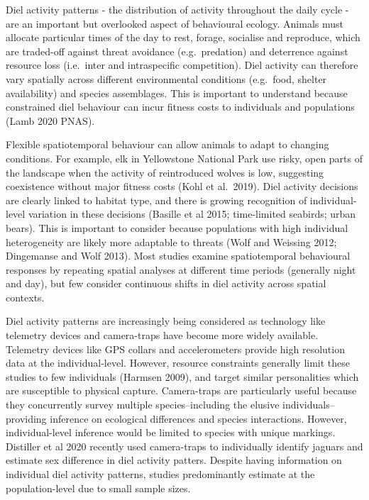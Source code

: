 \documentclass[]{elsarticle} %
\begin{document}
Diel activity patterns - the distribution of activity throughout the daily cycle - are an important but overlooked aspect of behavioural ecology. Animals must allocate particular times of the day to rest, forage, socialise and reproduce, which are traded-off against threat avoidance (e.g.~predation) and deterrence against resource loss (i.e.~inter and intraspecific competition). Diel activity can therefore vary spatially across different environmental conditions (e.g.~food, shelter availability) and species assemblages. This is important to understand because constrained diel behaviour can incur fitness costs to individuals and populations (Lamb 2020 PNAS).

Flexible spatiotemporal behaviour can allow animals to adapt to changing conditions. For example, elk in Yellowstone National Park use risky, open parts of the landscape when the activity of reintroduced wolves is low, suggesting coexistence without major fitness costs (Kohl et al.~2019). Diel activity decisions are clearly linked to habitat type, and there is growing recognition of individual-level variation in these decisions (Basille et al 2015; time-limited seabirds; urban bears). This is important to consider because populations with high individual heterogeneity are likely more adaptable to threats (Wolf and Weissing 2012; Dingemanse and Wolf 2013). Most studies examine spatiotemporal behavioural responses by repeating spatial analyses at different time periods (generally night and day), but few consider continuous shifts in diel activity across spatial contexts.

Diel activity patterns are increasingly being considered as technology like telemetry devices and camera-traps have become more widely available. Telemetry devices like GPS collars and accelerometers provide high resolution data at the individual-level. However, resource constraints generally limit these studies to few individuals (Harmsen 2009), and target similar personalities which are susceptible to physical capture. Camera-traps are particularly useful because they concurrently survey multiple species--including the elusive individuals--providing inference on ecological differences and species interactions. However, individual-level inference would be limited to species with unique markings. Distiller et al 2020 recently used camera-traps to individually identify jaguars and estimate sex difference in diel activity patters. Despite having information on individual diel activity patterns, studies predominantly estimate at the population-level due to small sample sizes.
\end{document}
